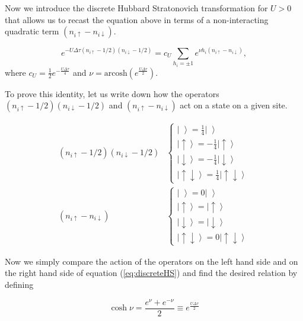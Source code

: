 Now we introduce the discrete Hubbard Stratonovich transformation for $U > 0$ that allows us to recast the equation above in terms of a non-interacting quadratic term $(n_{i\uparrow} - n_{i\downarrow} )$.

\begin{equation}\label{eq:discreteHS}
e^{-U \Delta\tau (n_{i\uparrow} - 1/2 ) (n_{i\downarrow} - 1/2 )} = c_U \sum_{h_i = \pm 1} e^{\nu h_i (n_{i\uparrow} - n_{i\downarrow} )},
\end{equation}
where $c_U = \frac{1}{2} e^{-\frac{U\Delta \tau}{4}}$ and $\nu = \text{arcosh} ( e^{\frac{U\Delta\tau}{2}})$.

To prove this identity, let us write down how the operators  $(n_{i\uparrow} - 1/2 ) (n_{i\downarrow} - 1/2 )$ and $(n_{i\uparrow} - n_{i\downarrow} )$ act on a state on a given site.

\begin{equation}
\begin{split}
(n_{i\uparrow} - 1/2 ) (n_{i\downarrow} - 1/2 )&
\begin{cases}
\left| \, \, \right\rangle = \frac{1}{4} \left| \, \, \right\rangle \\
\left| \uparrow \right\rangle = -\frac{1}{4} \left| \uparrow \right\rangle \\
\left| \downarrow \right\rangle = -\frac{1}{4} \left| \downarrow \right\rangle \\
\left| \uparrow \downarrow \right\rangle = \frac{1}{4} \left| \uparrow \downarrow \right\rangle
\end{cases}\\
(n_{i\uparrow} - n_{i\downarrow} )&
\begin{cases}
\left| \, \, \right\rangle = 0\left| \, \, \right\rangle \\
\left| \uparrow \right\rangle = \left| \uparrow \right\rangle \\
\left| \downarrow \right\rangle = \left| \downarrow \right\rangle \\
\left| \uparrow \downarrow \right\rangle = 0 \left| \uparrow \downarrow \right\rangle
\end{cases}
\end{split}
\end{equation}

Now we simply compare the action of the operators on the left hand side and on the right hand side of equation (\ref{eq:discreteHS}) and find the desired relation by defining

\begin{equation}
\cosh \nu =  \frac{e^\nu + e^{-\nu} }{2} \equiv e^{\frac{U\Delta \tau}{2}}
\end{equation}

